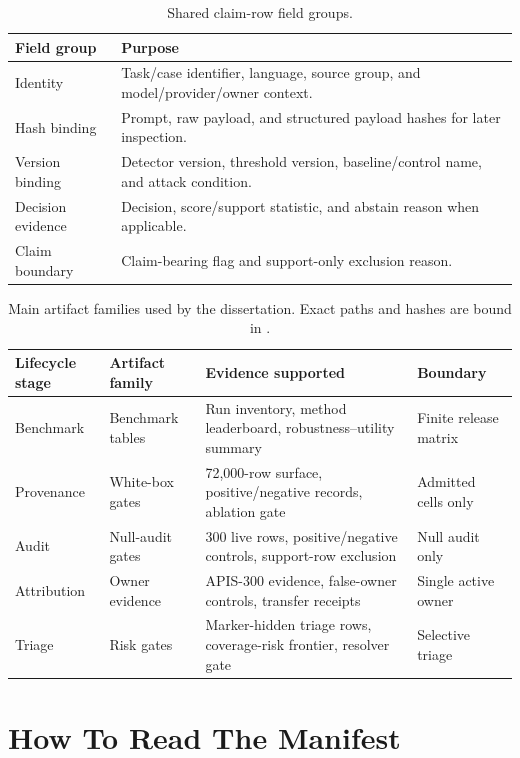 \begin{table}[htbp]
\centering
\caption{Shared claim-row field groups.}
\label{tab:claim-row-fields-app}
\tighttable
\begin{tabularx}{\textwidth}{@{}L{2.20cm}Y@{}}
\toprule
Field group & Purpose \\
\midrule
Identity & Task/case identifier, language, source group, and model/provider/owner context. \\
Hash binding & Prompt, raw payload, and structured payload hashes for later inspection. \\
Version binding & Detector version, threshold version, baseline/control name, and attack condition. \\
Decision evidence & Decision, score/support statistic, and abstain reason when applicable. \\
Claim boundary & Claim-bearing flag and support-only exclusion reason. \\
\bottomrule
\end{tabularx}
\end{table}

\begin{table}[htbp]
\centering
\caption{Main artifact families used by the dissertation. Exact paths and hashes are bound in .}
\label{tab:appendix-artifact-index}
\tighttable
\begin{tabularx}{\textwidth}{@{}L{1.80cm}L{2.45cm}YY@{}}
\toprule
Lifecycle stage & Artifact family & Evidence supported & Boundary \\
\midrule
Benchmark & Benchmark tables & Run inventory, method leaderboard, robustness--utility summary & Finite release matrix \\
Provenance & White-box gates & 72,000-row surface, positive/negative records, ablation gate & Admitted cells only \\
Audit & Null-audit gates & 300 live rows, positive/negative controls, support-row exclusion & Null audit only \\
Attribution & Owner evidence & APIS-300 evidence, false-owner controls, transfer receipts & Single active owner \\
Triage & Risk gates & Marker-hidden triage rows, coverage-risk frontier, resolver gate & Selective triage \\
\bottomrule
\end{tabularx}
\end{table}

\section{How To Read The Manifest}

